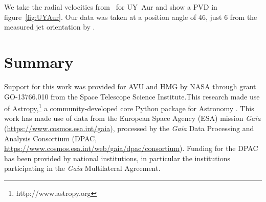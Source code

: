 \documentclass[twocolumn]{aastex62}
\begin{document}
We take the radial velocities from~\citet{2012ApJ...745..119N} for UY~Aur and show a PVD in figure~\ref{fig:UYAur}.
Our data was taken at a position angle of 46\degr{}, just 6\degr{} from the measured jet orientation by \citet{1997A&AS..126..437H}.



\section{Summary}
\label{Sect:summary}



\acknowledgments
Support for this work was provided for AVU and HMG by NASA through
grant GO-13766.010 from the Space Telescope Science Institute.This research made use of Astropy,\footnote{http://www.astropy.org} a community-developed core Python package for Astronomy \citep{2013A&A...558A..33A,2018AJ....156..123A}. 
This work has made use of data from the European Space Agency (ESA) mission
{\it Gaia} (\url{https://www.cosmos.esa.int/gaia}), processed by the {\it Gaia}
Data Processing and Analysis Consortium (DPAC,
\url{https://www.cosmos.esa.int/web/gaia/dpac/consortium}). Funding for the DPAC
has been provided by national institutions, in particular the institutions
participating in the {\it Gaia} Multilateral Agreement.




\end{document}
